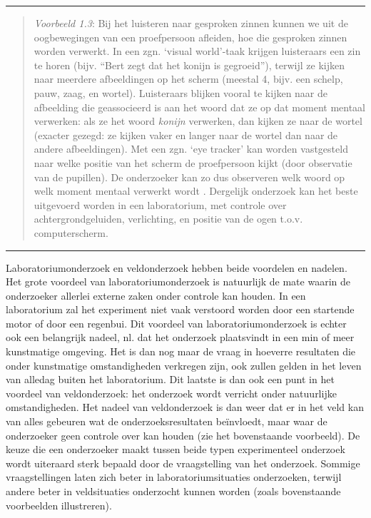 \documentclass[
]{book}
\begin{document}
\begin{center}\rule{0.5\linewidth}{0.5pt}\end{center}

\begin{quote}
\emph{Voorbeeld 1.3}: Bij het luisteren naar gesproken zinnen kunnen we uit de oogbewegingen van een proefpersoon afleiden, hoe die gesproken zinnen worden verwerkt. In een zgn. `visual world'-taak krijgen luisteraars een zin te horen (bijv. ``Bert zegt dat het konijn is gegroeid''), terwijl ze kijken naar meerdere afbeeldingen op het scherm (meestal 4, bijv. een schelp, pauw, zaag, en wortel). Luisteraars blijken vooral te kijken naar de afbeelding die geassocieerd is aan het woord dat ze op dat moment mentaal verwerken: als ze het woord \emph{konijn} verwerken, dan kijken ze naar de wortel (exacter gezegd: ze kijken vaker en langer naar de wortel dan naar de andere afbeeldingen). Met een zgn. `eye tracker' kan worden vastgesteld naar welke positie van het scherm de proefpersoon kijkt (door observatie van de pupillen). De onderzoeker kan zo dus observeren welk woord op welk moment mentaal verwerkt wordt \citep{KMR12}. Dergelijk onderzoek kan het beste uitgevoerd worden in een laboratorium, met controle over achtergrondgeluiden, verlichting, en positie van de ogen t.o.v. computerscherm.
\end{quote}

\begin{center}\rule{0.5\linewidth}{0.5pt}\end{center}

Laboratoriumonderzoek en veldonderzoek hebben beide voordelen en
nadelen. Het grote voordeel van laboratoriumonderzoek is natuurlijk de
mate waarin de onderzoeker allerlei externe zaken onder controle kan
houden. In een laboratorium zal het experiment niet vaak verstoord
worden door een startende motor of door een regenbui. Dit voordeel van
laboratoriumonderzoek is echter ook een belangrijk nadeel, nl. dat het
onderzoek plaatsvindt in een min of meer kunstmatige omgeving. Het is
dan nog maar de vraag in hoeverre resultaten die onder kunstmatige
omstandigheden verkregen zijn, ook zullen gelden in het leven van
alledag buiten het laboratorium. Dit laatste is dan ook een punt in het
voordeel van veldonderzoek: het onderzoek wordt verricht onder
natuurlijke omstandigheden. Het nadeel van veldonderzoek is dan weer dat
er in het veld kan van alles gebeuren wat de onderzoeksresultaten
beïnvloedt, maar waar de onderzoeker geen controle over kan houden (zie het bovenstaande
voorbeeld). De keuze die een onderzoeker maakt tussen
beide typen experimenteel onderzoek wordt uiteraard sterk bepaald door
de vraagstelling van het onderzoek. Sommige vraagstellingen laten zich
beter in laboratoriumsituaties onderzoeken, terwijl andere beter in
veldsituaties onderzocht kunnen worden (zoals bovenstaande voorbeelden
illustreren).
\end{document}
